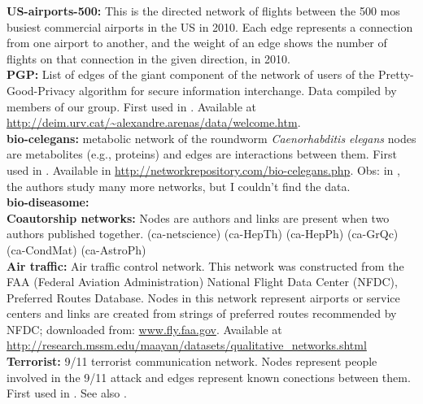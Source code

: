 \documentclass{article}
\begin{document}
\textbf{US-airports-500:} This is the directed network of flights between the 500 mos busiest commercial airports in the US in 2010. Each edge represents a connection from one airport to another, and the weight of an edge shows the number of flights on that connection in the given direction, in 2010.
\\

\textbf{PGP:} List of edges of the giant component of the network of users of the Pretty-Good-Privacy algorithm for secure information interchange. Data compiled by members of our group. First used in \cite{Boguna2004ModelsAttachment}. Available at \url{http://deim.urv.cat/~alexandre.arenas/data/welcome.htm}.
\\


\textbf{bio-celegans:} metabolic network of the roundworm \emph{Caenorhabditis elegans} nodes are metabolites (e.g., proteins) and edges are interactions between them. First used in \cite{Jeong2000TheNetworks}. Available in \url{http://networkrepository.com/bio-celegans.php}. Obs: in  \cite{Jeong2000TheNetworks}, the authors study many more networks, but I couldn't find the data.
\\

\textbf{bio-diseasome:} 
\\

\textbf{Coautorship networks:} Nodes are authors and links are present when two authors published together. (ca-netscience) (ca-HepTh) (ca-HepPh) (ca-GrQc) (ca-CondMat) (ca-AstroPh)
\\

\textbf{Air traffic:} Air traffic control network. This network was constructed from the FAA (Federal Aviation Administration) National Flight Data Center (NFDC), Preferred Routes Database. Nodes in this network represent airports or service centers and links are created from strings of preferred routes recommended by NFDC; downloaded from: \url{www.fly.faa.gov}. Available at \url{http://research.mssm.edu/maayan/datasets/qualitative_networks.shtml}
\\

\textbf{Terrorist:} 9/11 terrorist communication network. Nodes represent people involved in the 9/11 attack and edges represent known conections between them. First used in \cite{Krebs2002MappingCells}. See also \cite{Tian2017ArticulationNetworks}.
\\
\end{document}
